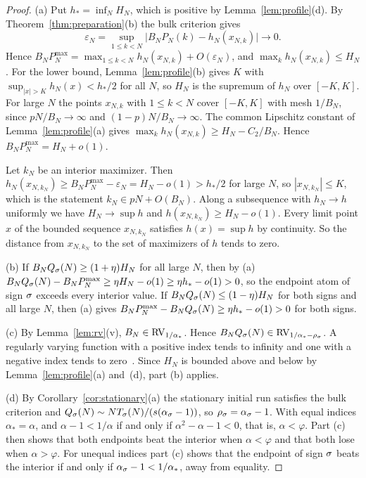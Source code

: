 \begin{proof}
(a) Put $h_*=\inf_NH_N$, which is positive by Lemma~\ref{lem:profile}(d). By Theorem~\ref{thm:preparation}(b) the bulk criterion
gives
\begin{equation}\label{eq:mode-interior}
 \varepsilon_N=\sup_{1\le k<N}\bigl|B_NP_N(k)-h_N(x_{N,k})\bigr|\to0 .
\end{equation}
Hence $B_NP^{\max}_N=\max_{1\le k<N}h_N(x_{N,k})+O(\varepsilon_N)$, and
$\max_kh_N(x_{N,k})\le H_N$. For the lower bound, Lemma~\ref{lem:profile}(b) gives $K$
with $\sup_{|x|>K}h_N(x)<h_*/2$ for all $N$, so $H_N$ is the supremum of $h_N$ over
$[-K,K]$. For large $N$ the points $x_{N,k}$ with $1\le k<N$ cover $[-K,K]$ with mesh
$1/B_N$, since $pN/B_N\to\infty$ and $(1-p)N/B_N\to\infty$. The common Lipschitz
constant of Lemma~\ref{lem:profile}(a) gives $\max_kh_N(x_{N,k})\ge H_N-C_2/B_N$. Hence
$B_NP^{\max}_N=H_N+o(1)$.

Let $k_N$ be an interior maximizer. Then $h_N(x_{N,k_N})\ge
B_NP^{\max}_N-\varepsilon_N=H_N-o(1)>h_*/2$ for large $N$, so $|x_{N,k_N}|\le K$, which
is the statement $k_N\in pN+O(B_N)$. Along a subsequence with $h_N\to h$
uniformly we have $H_N\to\sup h$ and $h(x_{N,k_N})\ge H_N-o(1)$. Every limit
point $x$ of the bounded sequence $x_{N,k_N}$ satisfies $h(x)=\sup h$ by
continuity. So the distance from $x_{N,k_N}$ to the set of maximizers of $h$
tends to zero.

(b) If $B_NQ_\sigma(N)\ge(1+\eta)H_N$ for all large $N$, then by (a)
$B_NQ_\sigma(N)-B_NP^{\max}_N\ge\eta H_N-o(1)\ge\eta h_*-o(1)>0$, so the endpoint atom
of sign $\sigma$ exceeds every interior value. If $B_NQ_\sigma(N)\le(1-\eta)H_N$ for
both signs and all large $N$, then (a) gives $B_NP^{\max}_N-B_NQ_\sigma(N)\ge\eta h_*-o(1)>0$
for both signs.

(c) By Lemma~\ref{lem:rv}(v), $B_N\in\mathrm{RV}_{1/\alpha_*}$. Hence
$B_NQ_\sigma(N)\in\mathrm{RV}_{1/\alpha_*-\rho_\sigma}$. A regularly varying function with a
positive index tends to infinity and one with a negative index tends to
zero~\cite[Proposition~1.5.1]{bgt1989}. Since $H_N$ is bounded above and below by
Lemma~\ref{lem:profile}(a) and~(d), part (b) applies.

(d) By Corollary~\ref{cor:stationary}(a) the stationary initial run satisfies the
bulk criterion and $Q_\sigma(N)\sim NT_\sigma(N)/(s(\alpha_\sigma-1))$, so
$\rho_\sigma=\alpha_\sigma-1$. With equal indices $\alpha_*=\alpha$, and $\alpha-1<1/\alpha$
if and only if $\alpha^2-\alpha-1<0$, that is, $\alpha<\varphi$. Part (c) then shows
that both endpoints beat the interior when $\alpha<\varphi$ and that both lose when
$\alpha>\varphi$. For unequal indices part (c) shows that the endpoint of sign $\sigma$
beats the interior if and only if $\alpha_\sigma-1<1/\alpha_*$, away from equality.


\end{proof}
